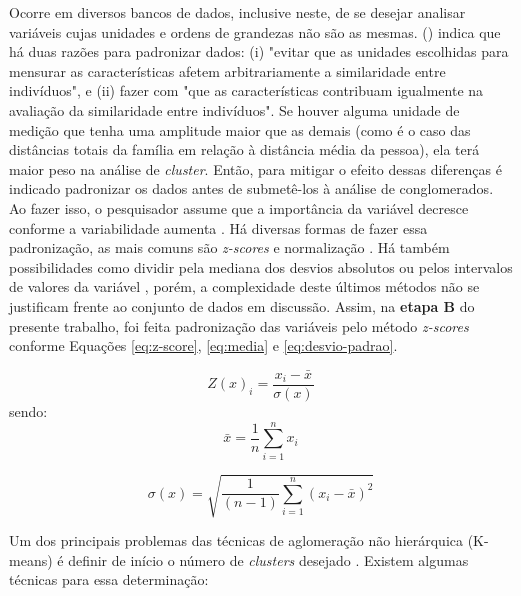 Ocorre em diversos bancos de dados, inclusive neste, de se desejar analisar variáveis cujas unidades e ordens de grandezas não são as mesmas.
 (\citeyear{FARIA2009}) indica que há duas razões para padronizar dados: (i) "evitar que as unidades escolhidas para mensurar as características afetem arbitrariamente a similaridade entre indivíduos", e (ii) fazer com "que as características contribuam igualmente na avaliação da similaridade entre indivíduos". Se houver alguma unidade de medição que tenha uma amplitude maior que as demais (como é o caso das distâncias totais da família em relação à distância média da pessoa), ela terá maior peso na análise de \textit{cluster}. Então, para mitigar o efeito dessas diferenças é indicado padronizar os dados antes de submetê-los à análise de conglomerados. Ao fazer isso, o pesquisador assume que a importância da variável decresce conforme a variabilidade aumenta \cite{EVERITT2011}. Há diversas formas de fazer essa padronização, as mais comuns são \textit{z-scores} e normalização \cite{FAVERO2009}. Há também possibilidades como dividir pela mediana dos desvios absolutos ou pelos intervalos de valores da variável , porém, a complexidade deste últimos métodos não se justificam frente ao conjunto de dados em discussão. Assim, na \textbf{etapa B} do presente trabalho, foi feita padronização das variáveis pelo método \textit{z-scores} conforme Equações \eqref{eq:z-score}, \eqref{eq:media} e \eqref{eq:desvio-padrao}.

\begin{equation}\label{eq:z-score}
Z(x)_{i} = \frac{x_{i} - \bar{x}}{\sigma(x)}
\end{equation}
sendo:
\begin{equation}\label{eq:media}
\bar{x} = \frac{1}{n} \sum_{i=1}^{n} x_{i}
\end{equation}

\begin{equation}\label{eq:desvio-padrao}
\sigma(x) = \sqrt{\frac{1}{(n-1)} \sum_{i=1}^{n}(x_{i}-\bar{x})^2 }
\end{equation}

\newpage
Um dos principais problemas das técnicas de aglomeração não hierárquica (K-means) é definir de início o número de \textit{clusters} desejado \cite{HARTIGAN1985, FAVERO2009, EVERITT2011}. Existem algumas técnicas para essa determinação:

